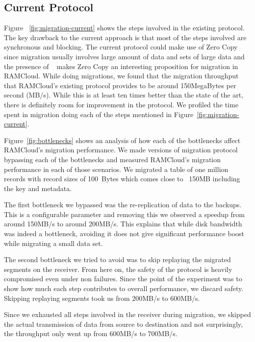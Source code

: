 \subsection{Current Protocol}
Figure ~\ref{fig:migration-current} shows the steps involved in the existing protocol. The key drawback to the current approach is that 
most of the steps involved are synchronous and blocking. The current protocol could make use of Zero Copy since migration usually involves 
large amount of data and sets of large data and the presence of ~\cite{ramcloudtx} makes Zero Copy an interesting proposition 
for migration in RAMCloud. While doing migrations, we found that the migration throughput that RAMCloud's existing protocol provides to 
be around 150MegaBytes per second (MB/s). While this is at least ten times better than the state of the art, there is definitely room for improvement in the protocol.
We profiled the time spent in migration doing each of the steps mentioned in Figure~\ref{fig:migration-current}.



Figure~\ref{fig:bottlenecks} shows an analysis of how each of the bottlenecks affect RAMCloud's migration performance. We made versions of migration 
protocol bypassing each of the bottlenecks and measured RAMCloud's migration performance in each of those scenarios. We migrated a table of one million 
records with record sizes of 100~Bytes which comes close to ~150MB including the key and metadata.

The first bottleneck we bypassed was the re-replication of data to the backups. This is a configurable parameter and removing this we observed a speedup from around 150MB/s to around 
200MB/s. This explains that while disk bandwidth was indeed a bottleneck, avoiding it does not give significant performance boost while migrating a small data set.

The second bottleneck we tried to avoid was to skip replaying the migrated segments on the receiver. From here on, the safety of the protocol is heavily compromised even under 
 non failures. Since the point of the experiment was to show how much each step contributes to overall performance, we discard safety. Skipping replaying segments took us from 
 200MB/s to 600MB/s. 

Since we exhausted all steps involved in the receiver during migration, we skipped the actual transmission of data from source to destination and not surprisingly, the throughput 
only went up from 600MB/s to 700MB/s. 

